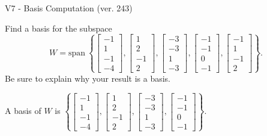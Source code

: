 \begin{exercise}
  \begin{exerciseTitle}V7 - Basis Computation (ver. 243)\end{exerciseTitle}
  \begin{exerciseStatement}
    Find a basis for the subspace 
\[W=\mathrm{span}\ \left\{\left[\begin{array}{r}
-1 \\
1 \\
-1 \\
-4
\end{array}\right] , \left[\begin{array}{r}
1 \\
2 \\
-1 \\
2
\end{array}\right] , \left[\begin{array}{r}
-3 \\
-3 \\
1 \\
-3
\end{array}\right] , \left[\begin{array}{r}
-1 \\
-1 \\
0 \\
-1
\end{array}\right] , \left[\begin{array}{r}
-1 \\
1 \\
-1 \\
2
\end{array}\right]\right\}.\]
 Be sure to explain why your result is a basis.


  \end{exerciseStatement}
  \begin{exerciseAnswer}
   A basis of \(W\) is  \(\left\{\left[\begin{array}{r}
-1 \\
1 \\
-1 \\
-4
\end{array}\right] , \left[\begin{array}{r}
1 \\
2 \\
-1 \\
2
\end{array}\right] , \left[\begin{array}{r}
-3 \\
-3 \\
1 \\
-3
\end{array}\right] , \left[\begin{array}{r}
-1 \\
-1 \\
0 \\
-1
\end{array}\right]\right\}\).
  


  \end{exerciseAnswer}
\end{exercise}